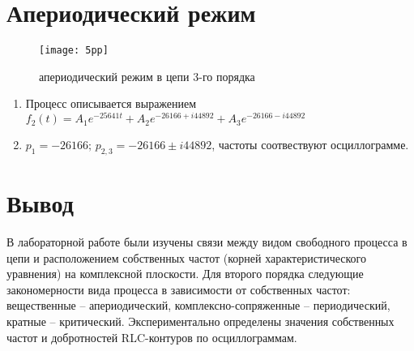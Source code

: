 \documentclass[a4paper,14pt ]{article} %
\begin{document}
\section{Апериодический режим}
\begin{figure}[H]
    \centering
    \texttt{[image: 5pp]}
    \caption{апериодический режим в цепи 3-го порядка}
\end{figure}
\begin{enumerate}
    \item Процесс описывается выражением $f_2(t) = A_1e^{-25641t} + 
    A_2e^{-26166+i44892} + A_3e^{-26166-i44892}$
    \item $p_1 = -26166; \, p_{2,3} = -26166 \pm i44892$, частоты соотвествуют осциллограмме.
\end{enumerate}
\section{Вывод}
В лабораторной работе были изучены связи между видом свободного
процесса в цепи и расположением собственных частот 
(корней характеристического уравнения) на комплексной плоскости. 
Для второго порядка следующие закономерности вида процесса в 
зависимости от собственных частот: вещественные – апериодический, 
комплексно-сопряженные – периодический, кратные – критический. 
Экспериментально определены значения собственных частот и добротностей 
RLC-контуров по осциллограммам. 
\end{document}
